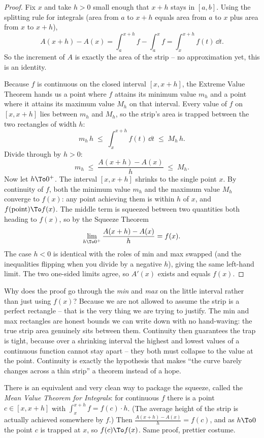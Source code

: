 \begin{proof}
Fix $x$ and take $h>0$ small enough that $x+h$ stays in $[a,b]$. Using the
splitting rule for integrals (area from $a$ to $x+h$ equals area from $a$ to $x$
plus area from $x$ to $x+h$),
\[
  A(x+h)-A(x)
  = \int_a^{x+h} f - \int_a^{x} f
  = \int_x^{x+h} f(t)\,\dd t .
\]
So the increment of $A$ is exactly the area of the strip -- no approximation yet,
this is an identity.

Because $f$ is continuous on the closed interval $[x,x+h]$, the Extreme Value
Theorem hands us a point where $f$ attains its minimum value $m_h$ and a point
where it attains its maximum value $M_h$ on that interval. Every value of $f$ on
$[x,x+h]$ lies between $m_h$ and $M_h$, so the strip's area is trapped between the
two rectangles of width $h$:
\[
  m_h\, h \;\le\; \int_x^{x+h} f(t)\,\dd t \;\le\; M_h\, h .
\]
Divide through by $h>0$:
\[
  m_h \;\le\; \frac{A(x+h)-A(x)}{h} \;\le\; M_h .
\]
Now let $h\To 0^+$. The interval $[x,x+h]$ shrinks to the single point $x$. By
continuity of $f$, both the minimum value $m_h$ and the maximum value $M_h$
converge to $f(x)$: any point achieving them is within $h$ of $x$, and
$f(\text{point})\To f(x)$. The middle term is squeezed between two quantities
both heading to $f(x)$, so by the Squeeze Theorem
\[
  \lim_{h\To 0^+}\frac{A(x+h)-A(x)}{h} = f(x).
\]
The case $h<0$ is identical with the roles of min and max swapped (and the
inequalities flipping when you divide by a negative $h$), giving the same
left-hand limit. The two one-sided limits agree, so $A'(x)$ exists and equals
$f(x)$.
\end{proof}

\begin{whybox}
Why does the proof go through the \emph{min} and \emph{max} on the little
interval rather than just using $f(x)$? Because we are not allowed to assume the
strip is a perfect rectangle -- that is the very thing we are trying to justify.
The min and max rectangles are honest bounds we can write down with no
hand-waving: the true strip area genuinely sits between them. Continuity then
guarantees the trap is tight, because over a shrinking interval the highest and
lowest values of a continuous function cannot stay apart -- they both must
collapse to the value at the point. Continuity is exactly the hypothesis that
makes ``the curve barely changes across a thin strip'' a theorem instead of a
hope.
\end{whybox}

\begin{remark}
There is an equivalent and very clean way to package the squeeze, called the
\emph{Mean Value Theorem for Integrals}: for continuous $f$ there is a point
$c\in[x,x+h]$ with $\int_x^{x+h} f = f(c)\cdot h$. (The average height of the
strip is actually achieved somewhere by $f$.) Then
$\frac{A(x+h)-A(x)}{h}=f(c)$, and as $h\To 0$ the point $c$ is trapped at $x$, so
$f(c)\To f(x)$. Same proof, prettier costume.
\end{remark}

